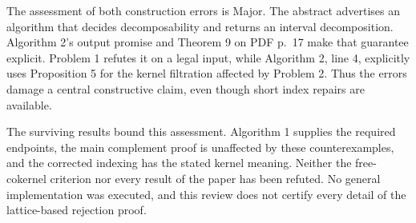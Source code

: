 \documentclass[10pt]{article}
\begin{document}
The assessment of both construction errors is Major. The abstract advertises an algorithm that decides decomposability and returns an interval decomposition. Algorithm 2’s output promise and Theorem 9 on PDF p. 17 make that guarantee explicit. Problem 1 refutes it on a legal input, while Algorithm 2, line 4, explicitly uses Proposition 5 for the kernel filtration affected by Problem 2. Thus the errors damage a central constructive claim, even though short index repairs are available.\par
The surviving results bound this assessment. Algorithm 1 supplies the required endpoints, the main complement proof is unaffected by these counterexamples, and the corrected indexing has the stated kernel meaning. Neither the free-cokernel criterion nor every result of the paper has been refuted. No general implementation was executed, and this review does not certify every detail of the lattice-based rejection proof.\par
\end{document}
